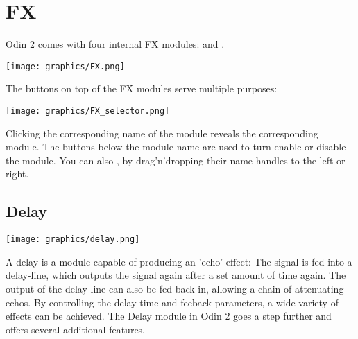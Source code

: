 \chapter{FX}
\label{FX}
Odin 2 comes with four internal FX modules:  and .

\begin{center}
    \texttt{[image: graphics/FX.png]}
\end{center}

The buttons on top of the FX modules serve multiple purposes:

\begin{center}
    \texttt{[image: graphics/FX\_selector.png]}
\end{center}

Clicking the corresponding name of the module reveals the corresponding module. The buttons below the module name are used to turn enable or disable the module.
You can also , by drag'n'dropping their name handles to the left or right.



\section{Delay}
\label{delay}
\begin{center}
    \texttt{[image: graphics/delay.png]}
\end{center}

A delay is a module capable of producing an 'echo' effect: The signal is fed into a delay-line, which outputs the signal again after a set amount of time again. The output of the delay line can also be fed back in, allowing a chain of attenuating echos. By controlling the delay time and feeback parameters, a wide variety of effects can be achieved. The Delay module in Odin 2 goes a step further and offers several additional features.


